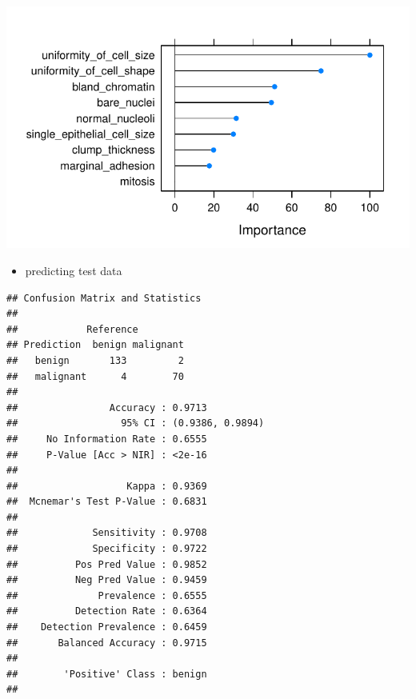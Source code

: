 \documentclass[]{article}
\newenvironment{Shaded}{\begin{snugshade}}{\end{snugshade}}
\newcommand{\KeywordTok}[1]{\textcolor[rgb]{0.13,0.29,0.53}{\textbf{{#1}}}}
\newcommand{\NormalTok}[1]{{#1}}
\providecommand{\tightlist}{%
  \setlength{\itemsep}{0pt}\setlength{\parskip}{0pt}}
\begin{document}
\begin{center}\includegraphics{webinar_code_files/figure-latex/importance_rf-1} \end{center}

\begin{itemize}
\tightlist
\item
  predicting test data
\end{itemize}

\begin{Shaded}
\end{Shaded}

\begin{verbatim}
## Confusion Matrix and Statistics
## 
##            Reference
## Prediction  benign malignant
##   benign       133         2
##   malignant      4        70
##                                           
##                Accuracy : 0.9713          
##                  95% CI : (0.9386, 0.9894)
##     No Information Rate : 0.6555          
##     P-Value [Acc > NIR] : <2e-16          
##                                           
##                   Kappa : 0.9369          
##  Mcnemar's Test P-Value : 0.6831          
##                                           
##             Sensitivity : 0.9708          
##             Specificity : 0.9722          
##          Pos Pred Value : 0.9852          
##          Neg Pred Value : 0.9459          
##              Prevalence : 0.6555          
##          Detection Rate : 0.6364          
##    Detection Prevalence : 0.6459          
##       Balanced Accuracy : 0.9715          
##                                           
##        'Positive' Class : benign          
## 
\end{verbatim}
\end{document}
